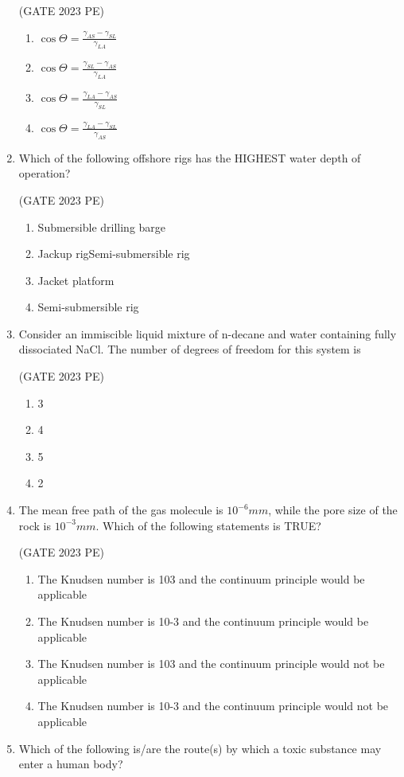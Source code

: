 \documentclass[journal,12pt,onecolumn]{exam}
\theoremstyle{remark}
\begin{document}
\begin{enumerate}
 \hfill{(GATE 2023 PE)}\\
\begin{enumerate}
     \item $\cos \Theta = \frac{\gamma_{AS} - \gamma_{SL}}{\gamma_{LA}}$
    \item $\cos \Theta = \frac{\gamma_{SL} - \gamma_{AS}}{\gamma_{LA}}$
    \item $\cos \Theta = \frac{\gamma_{LA} - \gamma_{AS}}{\gamma_{SL}}$
    \item $\cos \Theta = \frac{\gamma_{LA} - \gamma_{SL}}{\gamma_{AS}}$
\end{enumerate}
\item Which of the following offshore rigs has the HIGHEST water depth of operation?

 \hfill{(GATE 2023 PE)}\\
\begin{enumerate}
    \item Submersible drilling barge
    \item Jackup rigSemi-submersible rig
    \item Jacket platform
    \item Semi-submersible rig
\end{enumerate}
\item Consider an immiscible liquid mixture of n-decane and water containing fully
dissociated NaCl. The number of degrees of freedom for this system is

\hfill{(GATE 2023 PE)}\\
\begin{enumerate}
    \item 3
    \item 4
    \item 5
    \item 2
\end{enumerate}
\item The mean free path of the gas molecule is $10^{-6} mm$, while the pore size of the rock
is $10^{-3} mm$. Which of the following statements is TRUE?

\hfill{(GATE 2023 PE)}\\
\begin{enumerate}
    \item The Knudsen number is 103 and the continuum principle would be applicable
    \item The Knudsen number is 10-3 and the continuum principle would be applicable
    \item The Knudsen number is 103 and the continuum principle would not be applicable
    \item The Knudsen number is 10-3 and the continuum principle would not be applicable
\end{enumerate}
\item Which of the following is/are the route(s) by which a toxic substance may enter a human body?


\end{enumerate}
\end{document}
